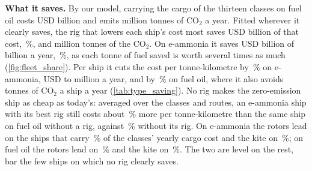 \textbf{What it saves.} By our model, carrying the cargo of the thirteen classes on fuel oil costs USD \NumFleetBillOil{} billion and emits \NumFleetEmittedOil{} million tonnes of CO$_2$ a year. Fitted wherever it clearly saves, the rig that lowers each ship's cost most saves USD \NumFleetSavedOil{} billion of that cost, \NumFleetSavedShareOil\,\%, and \NumFleetCarbonOil{} million tonnes of the CO$_2$. On e-ammonia it saves USD \NumFleetSavedAmmonia{} billion of \NumFleetBillAmmonia{} billion a year, \NumFleetSavedShareAmmonia\,\%, as each tonne of fuel saved is worth several times as much (\cref{fig:fleet_share}).  Per ship it cuts the cost per tonne-kilometre by \NumAnswerSharesAmmonia\,\% on e-ammonia, USD \NumAnswerMoneyLowAmmonia{} to \NumAnswerMoneyHighAmmonia{} million a year, and by \NumAnswerSharesOil\,\% on fuel oil, where it also avoids \NumAnswerCarbonOil{} tonnes of CO$_2$ a ship a year (\cref{tab:type_saving}).  No rig makes the zero-emission ship as cheap as today's: averaged over the classes and routes, an e-ammonia ship with its best rig still costs about \NumPremiumBestRig\,\% more per tonne-kilometre than the same ship on fuel oil without a rig, against \NumPremiumNoRig\,\% without its rig. On e-ammonia the rotors lead on the ships that carry \NumFleetShareAmmoniaRotors\,\% of the classes' yearly cargo cost and the kite on \NumFleetShareAmmoniaKite\,\%; on fuel oil the rotors lead on \NumFleetShareOilRotors\,\% and the kite on \NumFleetShareOilKite\,\%. The two are level on the rest, bar the few ships on which no rig clearly saves.

